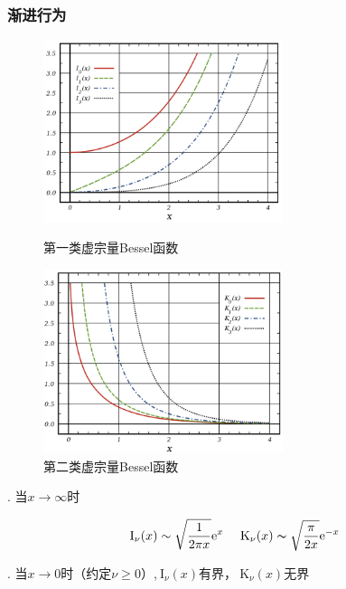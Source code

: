 \subsubsection{渐进行为}
\begin{figure}[H]
    \centering
    \begin{minipage}[t]{0.48\textwidth}
    \centering
    \includegraphics[width=7cm]{figures/I_nu.png}
    \caption{第一类虚宗量Bessel函数}
    \end{minipage}
    \begin{minipage}[t]{0.48\textwidth}
    \centering
    \includegraphics[width=7cm]{figures/K_nu.png}
    \caption{第二类虚宗量Bessel函数}
    \end{minipage}
\end{figure}
. 当$x\rightarrow\infty$时

$$\mathrm{I}_{\nu}(x)\sim\sqrt{\frac{1}{2\pi x}}\mathrm{e}^{x}\quad\mathrm{~K}_{\nu}(x)\thicksim\sqrt{\frac{\pi}{2x}}\mathrm{e}^{-x}$$

. 当$x\rightarrow0$时（约定$\nu\ge0$）,$\mathrm{~I}_\nu(x)$有界，$\mathrm{~K}_\nu(x)$无界

